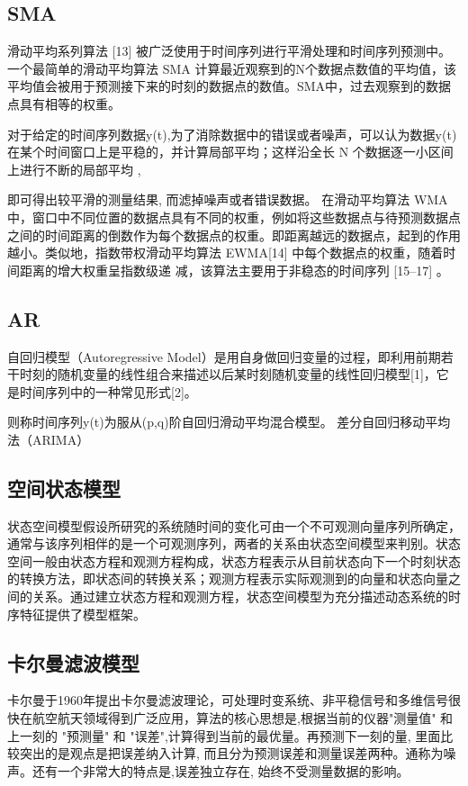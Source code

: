 \documentclass{article}
\begin{document}
\subsection{SMA}
滑动平均系列算法 [13] 被广泛使用于时间序列进行平滑处理和时间序列预测中。一个最简单的滑动平均算法 SMA 计算最近观察到的N个数据点数值的平均值，该平均值会被用于预测接下来的时刻的数据点的数值。SMA中，过去观察到的数据点具有相等的权重。

\par 对于给定的时间序列数据y(t),为了消除数据中的错误或者噪声，可以认为数据y(t)在某个时间窗口上是平稳的，并计算局部平均；这样沿全长 N 个数据逐一小区间上进行不断的局部平均 , 

\par 即可得出较平滑的测量结果, 而滤掉噪声或者错误数据。
在滑动平均算法 WMA 中，窗口中不同位置的数据点具有不同的权重，例如将这些数据点与待预测数据点之间的时间距离的倒数作为每个数据点的权重。即距离越远的数据点，起到的作用越小。类似地，指数带权滑动平均算法 EWMA[14] 中每个数据点的权重，随着时间距离的增大权重呈指数级递 减，该算法主要用于非稳态的时间序列 [15–17] 。

\subsection{AR}

自回归模型（Autoregressive Model）是用自身做回归变量的过程，即利用前期若干时刻的随机变量的线性组合来描述以后某时刻随机变量的线性回归模型[1]，它是时间序列中的一种常见形式[2]。
\par 则称时间序列y(t)为服从(p,q)阶自回归滑动平均混合模型。
差分自回归移动平均法（ARIMA）


\subsection{空间状态模型}
状态空间模型假设所研究的系统随时间的变化可由一个不可观测向量序列所确定，通常与该序列相伴的是一个可观测序列，两者的关系由状态空间模型来判别。状态空间一般由状态方程和观测方程构成，状态方程表示从目前状态向下一个时刻状态的转换方法，即状态间的转换关系；观测方程表示实际观测到的向量和状态向量之间的关系。通过建立状态方程和观测方程，状态空间模型为充分描述动态系统的时序特征提供了模型框架。

\subsection{卡尔曼滤波模型}
卡尔曼于1960年提出卡尔曼滤波理论，可处理时变系统、非平稳信号和多维信号很快在航空航天领域得到广泛应用，算法的核心思想是,根据当前的仪器"测量值" 和上一刻的 "预测量" 和 "误差",计算得到当前的最优量。再预测下一刻的量, 里面比较突出的是观点是把误差纳入计算, 而且分为预测误差和测量误差两种。通称为噪声。还有一个非常大的特点是,误差独立存在, 始终不受测量数据的影响。
\end{document}
